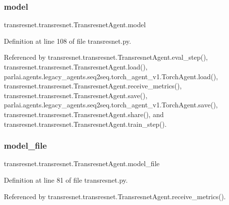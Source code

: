 \subsubsection{\texorpdfstring{model}{model}}
{\footnotesize\ttfamily transresnet.\+transresnet.\+Transresnet\+Agent.\+model}



Definition at line 108 of file transresnet.\+py.



Referenced by transresnet.\+transresnet.\+Transresnet\+Agent.\+eval\+\_\+step(), transresnet.\+transresnet.\+Transresnet\+Agent.\+load(), parlai.\+agents.\+legacy\+\_\+agents.\+seq2seq.\+torch\+\_\+agent\+\_\+v1.\+Torch\+Agent.\+load(), transresnet.\+transresnet.\+Transresnet\+Agent.\+receive\+\_\+metrics(), transresnet.\+transresnet.\+Transresnet\+Agent.\+save(), parlai.\+agents.\+legacy\+\_\+agents.\+seq2seq.\+torch\+\_\+agent\+\_\+v1.\+Torch\+Agent.\+save(), transresnet.\+transresnet.\+Transresnet\+Agent.\+share(), and transresnet.\+transresnet.\+Transresnet\+Agent.\+train\+\_\+step().

\mbox{\label{classtransresnet_1_1transresnet_1_1TransresnetAgent_a9e6903b45b3e65adc6e79b439b17af41}} 
\subsubsection{\texorpdfstring{model\+\_\+file}{model\_file}}
{\footnotesize\ttfamily transresnet.\+transresnet.\+Transresnet\+Agent.\+model\+\_\+file}



Definition at line 81 of file transresnet.\+py.



Referenced by transresnet.\+transresnet.\+Transresnet\+Agent.\+receive\+\_\+metrics().

\mbox{\label{classtransresnet_1_1transresnet_1_1TransresnetAgent_a468ba9e599d6b6f51261729974763b82}} 
